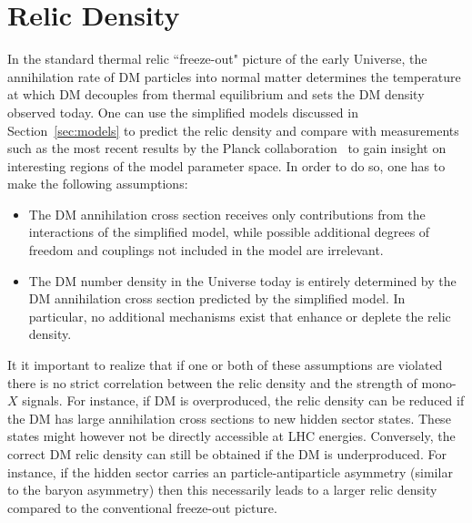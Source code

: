 

\section{Relic Density}
\label{sec:relic}

In the standard %
% 
thermal relic ``freeze-out" picture of the early Universe,
the annihilation rate of DM particles into normal matter determines the temperature at which DM decouples from thermal equilibrium and sets the DM density observed today.
One can use the simplified models discussed in Section~\ref{sec:models} to predict the relic density and compare with measurements such as the most recent results by the Planck collaboration~\cite{Ade:2015xua} to gain insight on interesting regions of the model parameter space. In order to do so, one has to make the following assumptions:
\begin{itemize}
\item The DM annihilation cross section receives only contributions from the interactions of the simplified model, while possible additional degrees of freedom and couplings not included in the model are irrelevant. 
\item The DM number density in the Universe today is entirely determined by  the DM annihilation cross section predicted by the simplified model. In particular, no additional mechanisms exist that enhance or deplete the relic density.
\end{itemize}

It it important to realize that if one or both of these assumptions are violated there is no strict correlation between the relic density and the strength of mono-$X$ signals. For instance, if DM is overproduced, the relic density can be reduced if the DM has large annihilation cross sections to new hidden sector states. These states might however not be directly accessible at LHC energies.  Conversely, the correct DM relic density can still be obtained  if the DM is underproduced. For instance, if the hidden sector carries an particle-antiparticle asymmetry (similar to the baryon asymmetry) then this necessarily leads to a larger relic density compared to the conventional freeze-out picture. 


